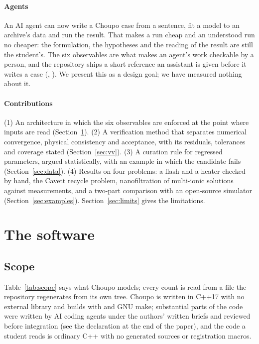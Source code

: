 \documentclass[preprint,12pt]{elsarticle}
\newcommand{\code}[1]{\texttt{\detokenize{#1}}}
\begin{document}
\paragraph{Agents}  An AI agent can now write a Choupo case from a
sentence, fit a model to an archive's data and run the result.  That
makes a run cheap and an understood run no cheaper: the formulation, the
hypotheses and the reading of the result are still the student's.  The
six observables are what makes an agent's work checkable by a person, and
the repository ships a short reference an assistant is given before it
writes a case (\code{AGENTS.md}, \code{docs/ai/}).  We present this as a
design goal; we have measured nothing about it.

\paragraph{Contributions}  (1) An architecture in which the six
observables are enforced at the point where inputs are read
(Section~\ref{sec:software}).  (2) A verification method that separates
numerical convergence, physical consistency and acceptance, with its
residuals, tolerances and coverage stated (Section~\ref{sec:vv}).  (3) A
curation rule for regressed parameters, argued statistically, with an
example in which the candidate fails (Section~\ref{sec:data}).  (4) Results
on four problems: a flash and a heater checked by hand, the Cavett recycle
problem, nanofiltration of multi-ionic solutions against measurements, and
a two-part comparison with an open-source simulator
(Section~\ref{sec:examples}).  Section~\ref{sec:limits} gives the
limitations.

\section{The software}
\label{sec:software}

\subsection{Scope}
\label{sec:scope}

Table~\ref{tab:scope} says what Choupo models; every count is read from a
file the repository regenerates from its own tree.  Choupo is written in
C++17 with no external library and builds with \code{g++} and GNU make;
substantial parts of the code were written by AI coding agents under the
authors' written briefs and reviewed before integration (see the
declaration at the end of the paper), and the code a student reads is
ordinary C++ with no generated sources or registration macros.
\end{document}
